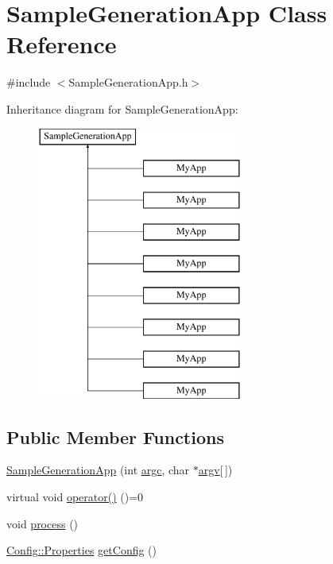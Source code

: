 \hypertarget{class_sample_generation_app}{}\section{Sample\+Generation\+App Class Reference}
\label{class_sample_generation_app}


{\ttfamily \#include $<$Sample\+Generation\+App.\+h$>$}

Inheritance diagram for Sample\+Generation\+App\+:\begin{figure}[H]
\begin{center}
\leavevmode
\includegraphics[height=9.000000cm]{class_sample_generation_app}
\end{center}
\end{figure}
\subsection*{Public Member Functions}
\begin{DoxyCompactItemize}
\item 
\hyperlink{class_sample_generation_app_ac7359b551057127947243e1251237a90}{Sample\+Generation\+App} (int \hyperlink{class_sample_generation_app_af98f6187cc8eb62fc3fe0ff53df76b6e}{argc}, char $\ast$\hyperlink{class_sample_generation_app_a7e490e3711491c2bc58351f9e9dd9945}{argv}\mbox{[}$\,$\mbox{]})
\item 
virtual void \hyperlink{class_sample_generation_app_a351fe6cfe624aeeee9ba4fb04d80ca0f}{operator()} ()=0
\item 
void \hyperlink{class_sample_generation_app_acec58569149ac1fc8af9525d35b9e88a}{process} ()
\item 
\hyperlink{class_config_1_1_properties}{Config\+::\+Properties} \hyperlink{class_sample_generation_app_a2c13df2c47ec917170e0b995218bb31b}{get\+Config} ()
\end{DoxyCompactItemize}
